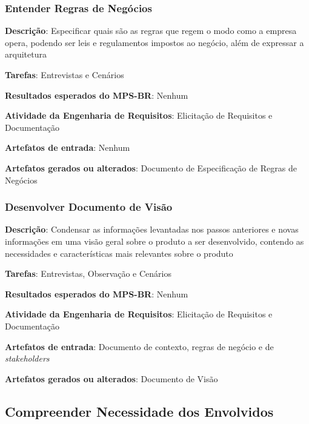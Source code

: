 \subsubsection{Entender Regras de Negócios}

\begin{description}
\item\textbf{Descrição}: Especificar quais são as regras que regem o modo como a empresa opera, podendo ser leis e regulamentos impostos ao negócio, além de expressar a arquitetura
\item\textbf{Tarefas}: Entrevistas e Cenários
\item\textbf{Resultados esperados do MPS-BR}: Nenhum
\item\textbf{Atividade da Engenharia de Requisitos}: Elicitação de Requisitos e Documentação
\item\textbf{Artefatos de entrada}: Nenhum
\item\textbf{Artefatos gerados ou alterados}: Documento de Especificação de Regras de Negócios
\end{description}

\subsubsection{Desenvolver Documento de Visão}

\begin{description}
\item\textbf{Descrição}: Condensar as informações levantadas nos passos anteriores e novas informações em uma visão geral sobre o produto a ser desenvolvido, contendo as necessidades e características mais relevantes sobre o produto
\item\textbf{Tarefas}: Entrevistas, Observação e Cenários
\item\textbf{Resultados esperados do MPS-BR}: Nenhum
\item\textbf{Atividade da Engenharia de Requisitos}: Elicitação de Requisitos e Documentação
\item\textbf{Artefatos de entrada}: Documento de contexto, regras de negócio e de \textit{stakeholders}
\item\textbf{Artefatos gerados ou alterados}: Documento de Visão
\end{description}

\subsection{Compreender Necessidade dos Envolvidos}

